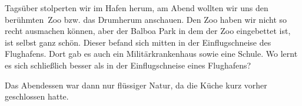 \vspace*{.4\paperheight}

Tagsüber stolperten wir im Hafen herum, am Abend wollten wir uns den \glqq berühmten\grqq \, Zoo bzw. das Drumherum anschauen.
Den Zoo haben wir nicht so recht ausmachen können, aber der Balboa Park in dem der Zoo eingebettet ist, ist selbst ganz schön.
Dieser befand sich mitten in der Einflugschneise des Flughafens.
Dort gab es auch ein Militärkrankenhaus sowie eine Schule.
Wo lernt es sich schließlich besser als in der Einflugschneise eines Flughafens?

Das Abendessen war dann nur flüssiger Natur, da die Küche kurz vorher geschlossen hatte.
